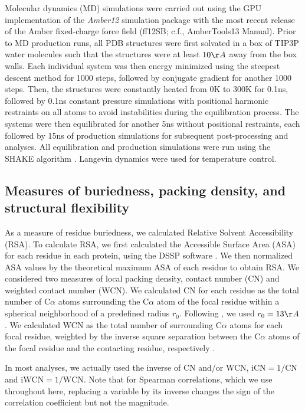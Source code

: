\documentclass[smallextended]{svjour3}
\begin{document}
Molecular dynamics (MD) simulations were carried out using the GPU implementation of the {\it Amber12} simulation package \citep{SalomonFerreretal2013} with the most recent release of the Amber fixed-charge force field (ff12SB; c.f., AmberTools13 Manual). Prior to MD production runs, all PDB structures were first solvated in a box of TIP3P water molecules \citep{jorgensen1983} such that the structures were  at least $10\AA$ away from the box walls. Each individual system was then energy minimized using the steepest descent method for 1000 steps, followed by conjugate gradient for another 1000 steps. Then, the structures were constantly heated from 0K to 300K for 0.1ns, followed by 0.1ns constant pressure simulations with positional harmonic restraints on all atoms to avoid instabilities during the equilibration process. The systems were then equilibrated for another 5ns without positional restraints, each followed by 15ns of production simulations for subsequent post-processing and analyses. All equilibration and production simulations were run using the SHAKE algorithm \citep{Ryckaert1977}. Langevin dynamics were used for temperature control.


\subsection*{Measures of buriedness, packing density, and structural flexibility}

As a measure of residue buriedness, we calculated Relative Solvent Accessibility (RSA). To calculate RSA, we first calculated the Accessible Surface Area (ASA) for each residue in each protein, using the DSSP software \citep{KabschSander1983}. We then normalized ASA values by the theoretical maximum ASA of each residue \citep{Tienetal2013} to obtain RSA. We considered two measures of local packing density, contact number (CN) and weighted contact number (WCN). We calculated CN for each residue as the total number of C$\alpha$ atoms surrounding the  C$\alpha$ atom of the focal residue within a spherical neighborhood of a predefined radius $r_0$. Following \citet{Yehetal2014}, we used $r_0=13\AA$. We calculated WCN as the total number of surrounding C$\alpha$ atoms for each focal residue, weighted by the inverse square separation between the C$\alpha$ atoms of the focal residue and the contacting residue, respectively \citep{Shihetal2012}.

In most analyses, we actually used the inverse of CN and/or WCN, $\text{iCN}=1/\text{CN}$ and $\text{iWCN}=1/\text{WCN}$. Note that for Spearman correlations, which we use throughout here, replacing a variable by its inverse changes the sign of the correlation coefficient but not the magnitude.
\end{document}
